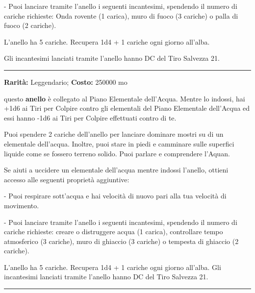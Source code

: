 \begin{multicols}{2}
\smallskip- Puoi lanciare tramite l'anello i seguenti incantesimi, spendendo il numero di cariche richieste: Onda rovente (1 carica), muro di fuoco (3 cariche) o palla di fuoco (2 cariche).

\medskip

L'anello ha 5 cariche. Recupera 1d4 + 1 cariche ogni giorno all'alba.

Gli incantesimi lanciati tramite l'anello hanno DC del Tiro Salvezza 21.

\smallskip\noindent\rule{\linewidth}{2pt}  \hypertarget{AnellodegliElementalidell'Acqua}{}\smallskip{}\noindent\label{AnellodegliElementalidell'Acqua}

\textbf{Rarità:} Leggendario; \textbf{Costo:} 250000 mo

questo \textbf{anello} è collegato al Piano Elementale dell'Acqua. Mentre lo indossi, hai +1d6 ai Tiri per Colpire contro gli elementali del Piano Elementale dell'Acqua ed essi hanno -1d6 ai Tiri per Colpire effettuati contro di te.

Puoi spendere 2 cariche dell'anello per lanciare dominare mostri su di un elementale dell'acqua. Inoltre, puoi stare in piedi e camminare sulle superfici liquide come se fossero terreno solido. Puoi parlare e comprendere l'Aquan.

Se aiuti a uccidere un elementale dell'acqua mentre indossi l'anello, ottieni accesso alle seguenti proprietà aggiuntive:

\smallskip- Puoi respirare sott'acqua e hai velocità di nuovo pari alla tua velocità di movimento.

\smallskip- Puoi lanciare tramite l'anello i seguenti incantesimi, spendendo il numero di cariche richieste: creare o distruggere acqua (1 carica), controllare tempo atmosferico (3 cariche), muro di ghiaccio (3 cariche) o tempesta di ghiaccio (2 cariche).

\medskip
L'anello ha 5 cariche. Recupera 1d4 + 1 cariche ogni giorno all'alba. Gli incantesimi lanciati tramite l'anello hanno DC del Tiro Salvezza 21.

\smallskip\noindent\rule{\linewidth}{2pt}  \hypertarget{AnellodegliElementalidell'Aria}{}\smallskip{}\noindent\label{AnellodegliElementalidell'Aria}


\end{multicols}

